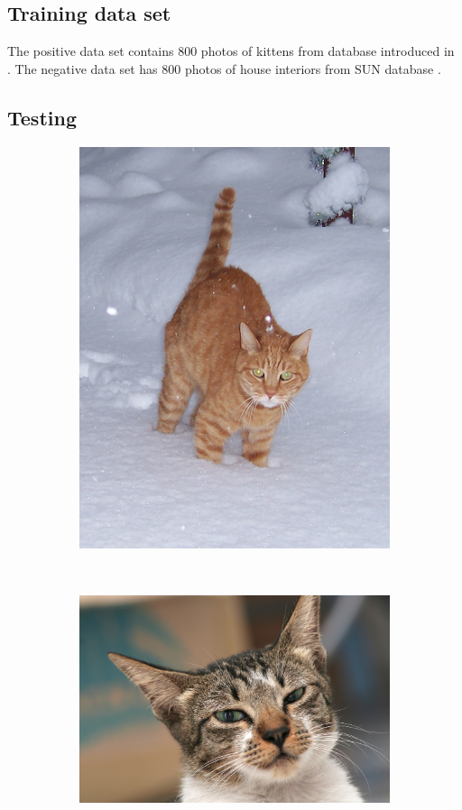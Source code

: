 \documentclass[hyperref]{acmtrans2e}
\begin{document}
\subsection{Training data set}
The positive data set contains 800 photos of kittens from database introduced in \cite{shape:2008}. The negative data set has 800 photos of house interiors from SUN database \cite{sun:2015}.

\subsection{Testing}
\begin{figure}
\centering
\begin{subfigure}{.3\textwidth}
  \centering
  \includegraphics[width=\linewidth]{02}
\end{subfigure}%
~~
\begin{subfigure}{.3\textwidth}
  \centering
  \includegraphics[width=\linewidth]{01}

\end{subfigure}
\end{figure}
\end{document}
